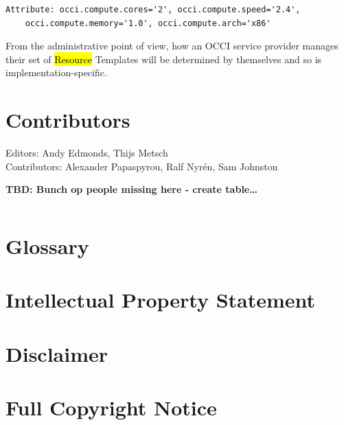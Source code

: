 \documentclass[10pt,a4paper]{article}
\begin{document}
\begin{verbatim}
Attribute: occi.compute.cores='2', occi.compute.speed='2.4', 
    occi.compute.memory='1.0', occi.compute.arch='x86'
\end{verbatim}

From the administrative point of view, how an OCCI service provider manages their set of 
\hl{Resource} Templates will be determined by themselves and so is implementation-specific.


\section{Contributors}

Editors: Andy Edmonds, Thijs Metsch \\
Contributors: Alexander Papaspyrou, Ralf Nyr\'en, Sam Johnston

\textbf{TBD: Bunch op people missing here - create table\ldots}

\begin{verbatim}

\end{verbatim}

\section{Glossary}


\section{Intellectual Property Statement}


\section{Disclaimer}


\section{Full Copyright Notice}




\end{document}

